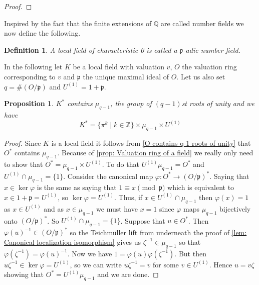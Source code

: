 \documentclass{article}
\newtheorem{definition}{Definition}[section]
\newtheorem{proposition}{Proposition}[section]
\newcommand{\mfrak}[1]{\mathfrak{#1}}
\newcommand{\mbb}[1]{\mathbb{#1}}
\numberwithin{equation}{section}
\begin{document}
\begin{proof}
\end{proof}

Inspired by the fact that the finite extensions of $\mbb Q$ are called number fields we now define the following.

\begin{definition}
    A local field of characteristic 0 is called a $\mfrak p$-adic number field. %
\end{definition}

In the following let $K$ be a local field with valuation $v$, $O$ the valuation ring corresponding to $v$ and $\mfrak p$ the unique maximal ideal of $O$. Let us also set $q = \#(O / \mfrak p)$ and $U^{(1)} = 1 + \mfrak p$.
\begin{proposition}\label{prop: Factorization of elements in K^*}
    $K^*$ contains $\mu_{q-1}$, the group of $(q-1)$st roots of unity and we have
    $$K^* = \{\pi^k \mid k \in \mbb Z \} \times \mu_{q-1} \times U^{(1)}$$
\end{proposition}
\begin{proof}
    Since $K$ is a local field it follows from \cref{O contains q-1 roots of unity} that $O^*$ contains $\mu_{q-1}$. Because of \cref{prop: Valuation ring of a field} we really only need to show that $O^* = \mu_{q-1} \times U^{(1)}$. To do that $U^{(1)} \mu_{q-1} = O^*$ and $U^{(1)} \cap \mu_{q-1} = \{1\}$. Consider the canonical map $\varphi : O^* \to (O / \mfrak p)^*$. Saying that $x \in \ker \varphi$ is the same as saying that $1 \equiv x \pmod{\mfrak p}$ which is equivalent to $x \in 1 + \mfrak p = U^{(1)}$, so $\ker \varphi = U^{(1)}$. Thus, if $x \in U^{(1)} \cap \mu_{q-1}$ then $\varphi(x) = 1$ as $x \in U^{(1)}$ and as $x \in \mu_{q-1}$ we must have $x = 1$ since $\varphi$ maps $\mu_{q-1}$ bijectively onto $(O/\mfrak p)^*$. So $U^{(1)} \cap \mu_{q-1} = \{ 1 \}$. Suppose that $u \in O^*$. Then $\varphi(u)^{-1} \in (O/\mfrak p)^*$ so the Teichmüller lift from underneath the proof of \cref{lem: Canonical localization isomorphism} gives us $\zeta^{-1} \in \mu_{q-1}$ so that $\varphi(\zeta^{-1}) = \varphi(u)^{-1}$. Now we have $1 = \varphi(u)\varphi(\zeta^{-1})$. But then $u\zeta^{-1} \in \ker \varphi = U^{(1)}$, so we can write $u\zeta^{-1} = v$ for some $v \in U^{(1)}$. Hence $u = v \zeta$ showing that $O^* = U^{(1)}\mu_{q-1}$ and we are done.
\end{proof}
\end{document}
